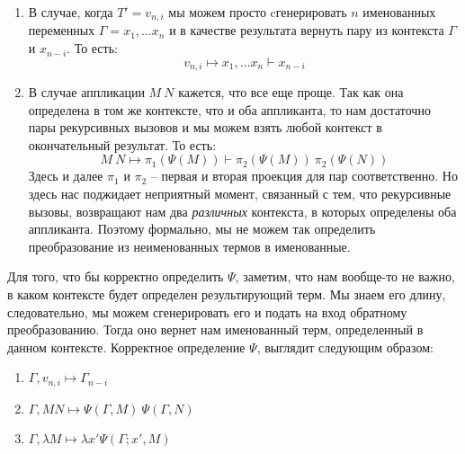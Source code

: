 \begin{enumerate}
  \item В случае, когда $T' = v_{n, i}$ мы можем просто cгенерировать $n$ именованных переменных $\Gamma = x_{1}, \dots x_{n}$ и в качестве результата вернуть пару из контекста $\Gamma$ и $x_{n - i}$. То есть:
  $$ v_{n, i} \mapsto x_{1}, \dots x_{n} \vdash x_{n-i} $$

  \item В случае аппликации $M\ N$ кажется, что все еще проще. Так как она определена в том же контексте, что и оба аппликанта, то нам достаточно пары рекурсивных вызовов и мы можем взять любой контекст в окончательный результат. То есть:
  $$ M\ N \mapsto \pi_{1}(\Psi(M)) \vdash \pi_{2}(\Psi(M))\ \pi_{2}(\Psi(N))$$
  Здесь и далее $\pi_{1}$ и $\pi_{2}$ -- первая и вторая проекция для пар соответственно.
  Но здесь нас поджидает неприятный момент, связанный с тем, что рекурсивные вызовы, возвращают нам два \textit{различных} контекста, в которых определены оба аппликанта. Поэтому формально, мы не можем так определить преобразование из неименованных термов в именованные.

\end{enumerate}

Для того, что бы корректно определить $\Psi$, заметим, что нам вообще-то не важно, в каком контексте будет определен результирующий терм. Мы знаем его длину, следовательно, мы можем сгенерировать его и подать на вход обратному преобразованию. Тогда оно вернет нам именованный терм, определенный в данном контексте. Корректное определение $\Psi$, выглядит следующим образом:

\begin{enumerate}
  \item $\Gamma, v_{n, i} \mapsto \Gamma_{n - i}$
  \item $\Gamma, M N \mapsto \Psi(\Gamma, M)\ \Psi(\Gamma, N)$
  \item $\Gamma, \lambda M \mapsto \lambda x' \Psi(\Gamma; x', M)$
\end{enumerate}

